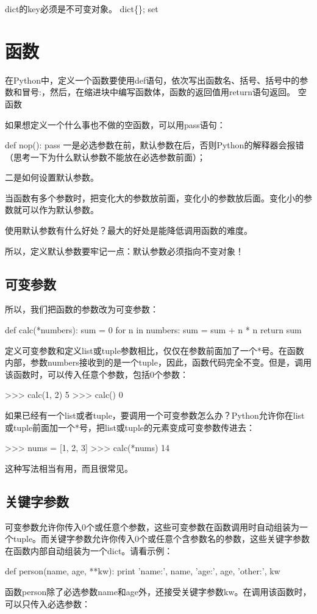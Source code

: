 dict的key必须是不可变对象。
dict\{\};
set
\chapter{函数}
在Python中，定义一个函数要使用def语句，依次写出函数名、括号、括号中的参数和冒号:，然后，在缩进块中编写函数体，函数的返回值用return语句返回。
空函数

如果想定义一个什么事也不做的空函数，可以用pass语句：

def nop():
    pass
一是必选参数在前，默认参数在后，否则Python的解释器会报错（思考一下为什么默认参数不能放在必选参数前面）；

二是如何设置默认参数。

当函数有多个参数时，把变化大的参数放前面，变化小的参数放后面。变化小的参数就可以作为默认参数。

使用默认参数有什么好处？最大的好处是能降低调用函数的难度。

所以，定义默认参数要牢记一点：默认参数必须指向不变对象！
\section{可变参数}
所以，我们把函数的参数改为可变参数：

def calc(*numbers):
    sum = 0
    for n in numbers:
        sum = sum + n * n
    return sum

定义可变参数和定义list或tuple参数相比，仅仅在参数前面加了一个*号。在函数内部，参数numbers接收到的是一个tuple，因此，函数代码完全不变。但是，调用该函数时，可以传入任意个参数，包括0个参数：

>>> calc(1, 2)
5
>>> calc()
0

如果已经有一个list或者tuple，要调用一个可变参数怎么办？Python允许你在list或tuple前面加一个*号，把list或tuple的元素变成可变参数传进去：

>>> nums = [1, 2, 3]
>>> calc(*nums)
14

这种写法相当有用，而且很常见。
\section{关键字参数}
可变参数允许你传入0个或任意个参数，这些可变参数在函数调用时自动组装为一个tuple。而关键字参数允许你传入0个或任意个含参数名的参数，这些关键字参数在函数内部自动组装为一个dict。请看示例：

def person(name, age, **kw):
    print 'name:', name, 'age:', age, 'other:', kw

函数person除了必选参数name和age外，还接受关键字参数kw。在调用该函数时，可以只传入必选参数：

